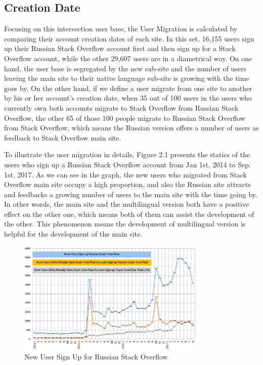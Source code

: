 \subsection{Creation Date}
Focusing on this intersection user base, the User Migration is calculated by comparing their account creation dates of each site. In this set, 16,155 users sign up their Russian Stack Overflow account first and then sign up for a Stack Overflow account, while the other 29,607 users are in a diametrical way. On one hand, the user base is segregated by the new sub-site and the number of users leaving the main site to their native language sub-site is growing with the time goes by. On the other hand, if we define a user migrate from one site to another by his or her account’s creation date, when 35 out of 100 users in the users who currently own both accounts migrate to Stack Overflow from Russian Stack Overflow, the other 65 of those 100 people migrate to Russian Stack Overflow from Stack Overflow, which means the Russian version offers a number of users as feedback to Stack Overflow main site. \par
To illustrate the user migration in details, Figure 2.1 presents the statics of the users who sign up a Russian Stack Overflow account from Jan 1st, 2014 to Sep. 1st, 2017. As we can see in the graph, the new users who migrated from Stack Overflow main site occupy a high proportion, and also the Russian site attracts and feedbacks a growing number of users to the main site with the time going by. In other words, the main site and the multilingual version both have a positive effect on the other one, which means both of them can assist the development of the other. This phenomenon means the development of multilingual version is helpful for the development of the main site.
\begin{figure}[!h]
	\includegraphics[width = 0.80\textwidth]{figures/userflow.png}
	\caption{New User Sign Up for Russian Stack Overflow}
\end{figure}
